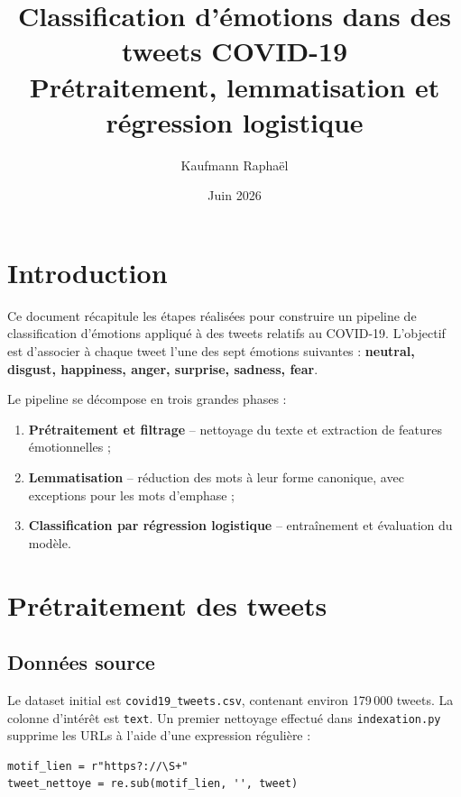 \documentclass[12pt, a4paper]{article}
\title{
    \textbf{Classification d'émotions dans des tweets COVID-19} \\[0.5em]
    \large Prétraitement, lemmatisation et régression logistique
}
\author{Kaufmann Raphaël}
\date{Juin 2026}
\begin{document}
\maketitle
\tableofcontents
\newpage

\section{Introduction}

Ce document récapitule les étapes réalisées pour construire un pipeline de classification
d'émotions appliqué à des tweets relatifs au COVID-19.
L'objectif est d'associer à chaque tweet l'une des sept émotions suivantes :
\textbf{neutral, disgust, happiness, anger, surprise, sadness, fear}.

Le pipeline se décompose en trois grandes phases :
\begin{enumerate}
    \item \textbf{Prétraitement et filtrage} -- nettoyage du texte et extraction de features émotionnelles ;
    \item \textbf{Lemmatisation} -- réduction des mots à leur forme canonique, avec exceptions pour les mots d'emphase ;
    \item \textbf{Classification par régression logistique} -- entraînement et évaluation du modèle.
\end{enumerate}

\section{Prétraitement des tweets}

\subsection{Données source}

Le dataset initial est \texttt{covid19\_tweets.csv}, contenant environ 179\,000 tweets.
La colonne d'intérêt est \texttt{text}.
Un premier nettoyage effectué dans \texttt{indexation.py} supprime les URLs à l'aide
d'une expression régulière :

\begin{lstlisting}
motif_lien = r"https?://\S+"
tweet_nettoye = re.sub(motif_lien, '', tweet)
\end{lstlisting}
\end{document}
